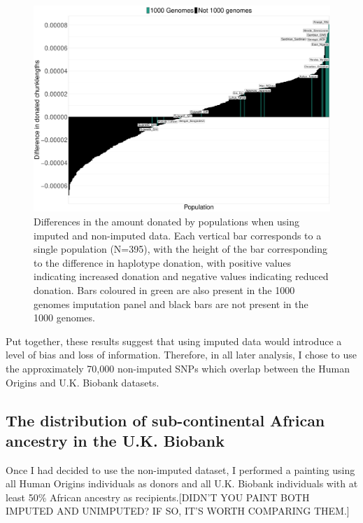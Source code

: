 {\begin{figure}
	    \centering
	    \includegraphics[width=1.0\textwidth]{../images/chapter3/imputed_excess_copying_pops.pdf}
	    \caption{Differences in the amount donated by populations when using imputed and non-imputed data. Each vertical bar corresponds to a single population (N=395), with the height of the bar corresponding to the difference in haplotype donation, with positive values indicating increased donation and negative values indicating reduced donation. Bars coloured in green are also present in the 1000 genomes imputation panel and black bars are not present in the 1000 genomes.}
	    \label{fig:imputed_excess_copying_pops}
\end{figure}

Put together, these results suggest that using imputed data would introduce a level of bias and loss of information. Therefore, in all later analysis, I chose to use the approximately 70,000 non-imputed SNPs which overlap between the Human Origins and U.K. Biobank datasets. 

\subsection{The distribution of sub-continental African ancestry in the U.K. Biobank}

Once I had decided to use the non-imputed dataset, I performed a painting using all Human Origins individuals as donors and all U.K. Biobank individuals with at least 50\% African ancestry as recipients.{\color{red}[DIDN'T YOU PAINT BOTH IMPUTED AND UNIMPUTED? IF SO, IT'S WORTH COMPARING THEM.]} 

}
